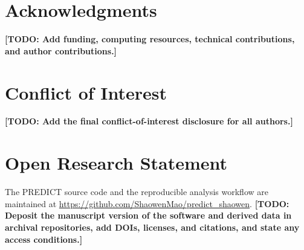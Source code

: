 \documentclass[
  draft,
  linenumbers
]{agujournal2025}
\newcommand{\todo}[1]{\textbf{[TODO: #1]}}
\begin{document}








\section*{Acknowledgments}
\todo{Add funding, computing resources, technical contributions, and author contributions.}

\section*{Conflict of Interest}
\todo{Add the final conflict-of-interest disclosure for all authors.}

\section*{Open Research Statement}
The PREDICT source code and the reproducible analysis workflow are maintained at \url{https://github.com/ShaowenMao/predict_shaowen}. \todo{Deposit the manuscript version of the software and derived data in archival repositories, add DOIs, licenses, and citations, and state any access conditions.}


\end{document}
